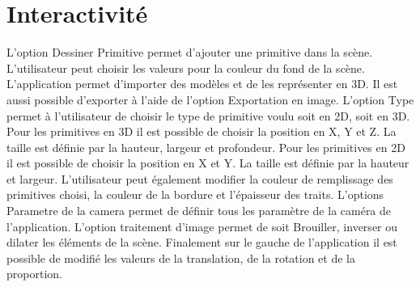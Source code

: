 \chapter{Interactivité}
\label{s:interactivite}

L’option Dessiner Primitive permet d’ajouter une primitive dans la scène. L’utilisateur peut choisir les valeurs pour la couleur du fond de la scène. 
L’application permet d’importer des modèles et de les représenter en 3D. Il est aussi possible d’exporter à l’aide de l’option Exportation en image. 
L’option Type permet à l’utilisateur de choisir le type de primitive voulu soit en 2D, soit en 3D. 
Pour les primitives en 3D il est possible de choisir la position en X, Y et Z. La taille est définie par la hauteur, largeur et profondeur.
Pour les primitives en 2D il est possible de choisir la position en X et Y.  La taille est définie par la hauteur et largeur.
L’utilisateur peut également modifier la couleur de remplissage des primitives choisi, la couleur de la bordure et l’épaisseur des traits. 
L’options Parametre de la camera permet de définir tous les paramètre de la caméra de l’application. 
L’option traitement d’image permet de soit Brouiller, inverser ou dilater les éléments de la scène.  
Finalement sur le gauche de l’application il est possible de modifié les valeurs de la translation, de la rotation et de la proportion.
